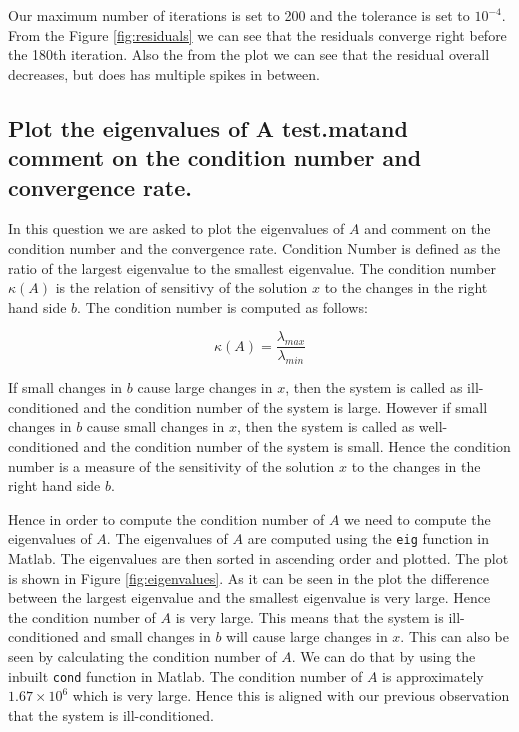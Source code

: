 \documentclass[unicode,11pt,a4paper,oneside,numbers=endperiod,openany]{scrartcl}
\begin{document}
Our maximum number of iterations is set to 200 and the tolerance is set to $10^{-4}$. From the Figure \ref{fig:residuals} we can see that the residuals converge right before the 180th iteration. Also the from the plot we can see that the residual overall decreases, but does has multiple spikes in between.

\subsection{Plot the eigenvalues of A test.matand comment on the condition number and convergence rate.}
In this question we are asked to plot the eigenvalues of $A$ and comment on the condition number and the convergence rate. Condition Number is defined as the ratio of the largest eigenvalue to the smallest eigenvalue. The condition number $\kappa(A)$ is the relation of sensitivy of the solution $x$ to the changes in the right hand side $b$. The condition number is computed as follows:

\begin{equation}
    \kappa(A) = \frac{\lambda_{max}}{\lambda_{min}}
\end{equation}

If small changes in $b$ cause large changes in $x$, then the system is called as ill-conditioned and the condition number of the system is large. However if small changes in $b$ cause small changes in $x$, then the system is called as well-conditioned and the condition number of the system is small. Hence the condition number is a measure of the sensitivity of the solution $x$ to the changes in the right hand side $b$.

Hence in order to compute the condition number of $A$ we need to compute the eigenvalues of $A$. The eigenvalues of $A$ are computed using the \texttt{eig} function in Matlab. The eigenvalues are then sorted in ascending order and plotted. The plot is shown in Figure \ref{fig:eigenvalues}. As it can be seen in the plot the difference between the largest eigenvalue and the smallest eigenvalue is very large. Hence the condition number of $A$ is very large. This means that the system is ill-conditioned and small changes in $b$ will cause large changes in $x$. This can also be seen by calculating the condition number of $A$. We can do that by using the inbuilt \texttt{cond} function in Matlab. The condition number of $A$ is approximately $1.67 \times 10^{6}$ which is very large. Hence this is aligned with our previous observation that the system is ill-conditioned.
\end{document}
